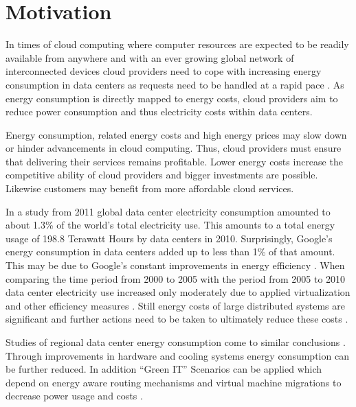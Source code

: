 

\section{Motivation}

In times of cloud computing where computer resources are expected to be readily available from anywhere and with an ever growing global network of interconnected devices cloud providers need to cope with increasing energy consumption in data centers as requests need to be handled at a rapid pace \cite{buyya2009cloud}. 
As energy consumption is directly mapped to energy costs, cloud providers aim to reduce power consumption and thus electricity costs within data centers. 

Energy consumption, related energy costs and high energy prices may slow down or hinder advancements in cloud computing. Thus, cloud providers must ensure that delivering their services remains profitable. Lower energy costs increase the competitive ability of cloud providers and bigger investments are possible. Likewise customers may benefit from more affordable cloud services. 

In a study from 2011 \cite{koomey2011growth} global data center electricity consumption amounted to about 1.3\% of the world's total electricity use. This amounts to a total energy usage of 198.8 Terawatt Hours by data centers in 2010. Surprisingly, Google's energy consumption in data centers added up to less than 1\% of that amount. This may be due to Google's constant improvements in energy efficiency \cite{google2015dc}. %
When comparing the time period from 2000 to 2005 with the period from 2005 to 2010 data center electricity use increased only moderately due to applied virtualization and other efficiency measures \cite{koomey2011growth, koomey2008worldwide}. Still energy costs of large distributed systems are significant and further actions need to be taken to ultimately reduce these costs \cite{qureshi2009cutting}.

Studies of regional data center energy consumption come to similar conclusions \cite{bitcom2014study}.%
Through improvements in hardware and cooling systems energy consumption can be further reduced. In addition "`Green IT"' Scenarios can be applied which depend on energy aware routing mechanisms and virtual machine migrations to decrease power usage and costs \cite{liu2009greencloud}. 

